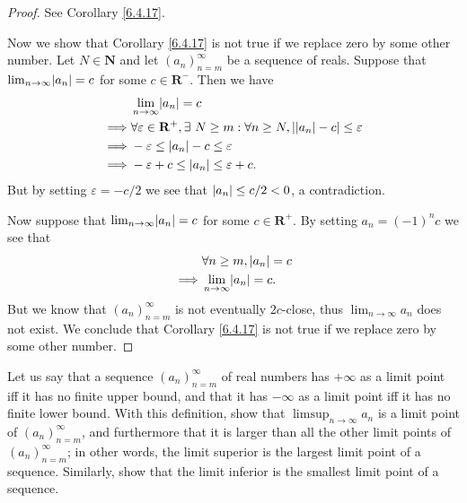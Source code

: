 \begin{proof}
    See Corollary \ref{6.4.17}.

    Now we show that Corollary \ref{6.4.17} is not true if we replace zero by some other number.
    Let \(N \in \mathbf{N}\) and let \((a_n)_{n = m}^\infty\) be a sequence of reals.
    Suppose that \(\lim_{n \to \infty} \abs*{a_n} = c\) for some \(c \in \mathbf{R}^-\).
    Then we have
    \begin{align*}
                 & \lim_{n \to \infty} \abs*{a_n} = c                                                                                 \\
        \implies & \forall \varepsilon \in \mathbf{R}^+, \exists\ N \geq m : \forall n \geq N, \abs*{\abs*{a_n} - c} \leq \varepsilon \\
        \implies & -\varepsilon \leq \abs*{a_n} - c \leq \varepsilon                                                                  \\
        \implies & -\varepsilon + c \leq \abs*{a_n} \leq \varepsilon + c.
    \end{align*}
    But by setting \(\varepsilon = -c / 2\) we see that \(\abs*{a_n} \leq c / 2 < 0\), a contradiction.

    Now suppose that \(\lim_{n \to \infty} \abs*{a_n} = c\) for some \(c \in \mathbf{R}^+\).
    By setting \(a_n = (-1)^n c\) we see that
    \begin{align*}
                 & \forall n \geq m, \abs*{a_n} = c    \\
        \implies & \lim_{n \to \infty} \abs*{a_n} = c.
    \end{align*}
    But we know that \((a_n)_{n = m}^\infty\) is not eventually \(2c\)-close, thus \(\lim_{n \to \infty} a_n\) does not exist.
    We conclude that Corollary \ref{6.4.17} is not true if we replace zero by some other number.
\end{proof}

\begin{exercise}\label{ex 6.4.8}
    Let us say that a sequence \((a_n)_{n = m}^\infty\) of real numbers has \(+\infty\) as a limit point iff it has no finite upper bound, and that it has \(-\infty\) as a limit point iff it has no finite lower bound.
    With this definition, show that \(\limsup_{n \to \infty} a_n\) is a limit point of \((a_n)_{n = m}^\infty\), and furthermore that it is larger than all the other limit points of \((a_n)_{n = m}^\infty\);
    in other words, the limit superior is the largest limit point of a sequence.
    Similarly, show that the limit inferior is the smallest limit point of a sequence.
\end{exercise}

